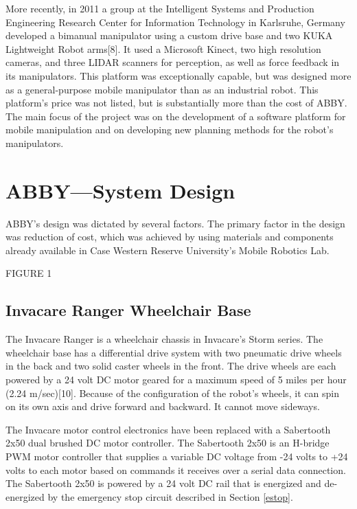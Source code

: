\documentclass[]{cwru} %
\begin{document}
More recently, in 2011 a group at the Intelligent Systems and Production
Engineering Research Center for Information Technology in Karlsruhe,
Germany developed a bimanual manipulator using a custom drive base and
two KUKA Lightweight Robot arms{[}8{]}. It used a Microsoft Kinect, two
high resolution cameras, and three LIDAR scanners for perception, as
well as force feedback in its manipulators. This platform was
exceptionally capable, but was designed more as a general-purpose mobile
manipulator than as an industrial robot. This platform's price was not
listed, but is substantially more than the cost of ABBY. The main focus
of the project was on the development of a software platform for mobile
manipulation and on developing new planning methods for the robot's
manipulators.


\chapter{ABBY---System Design}

ABBY's design was dictated by several factors. The primary factor in the
design was reduction of cost, which was achieved by using materials and
components already available in Case Western Reserve University's Mobile
Robotics Lab.

FIGURE 1

\section{Invacare Ranger Wheelchair Base}

The Invacare Ranger is a wheelchair chassis in Invacare's Storm series.
The wheelchair base has a differential drive system with two pneumatic
drive wheels in the back and two solid caster wheels in the front. The
drive wheels are each powered by a 24 volt DC motor geared for a maximum
speed of 5 miles per hour (2.24 m/sec){[}10{]}. Because of the
configuration of the robot's wheels, it can spin on its own axis and
drive forward and backward. It cannot move sideways.

The Invacare motor control electronics have been replaced with a
Sabertooth 2x50 dual brushed DC motor controller. The Sabertooth 2x50 is
an H-bridge PWM motor controller that supplies a variable DC voltage
from -24 volts to +24 volts to each motor based on commands it receives
over a serial data connection. The Sabertooth 2x50 is powered by a 24
volt DC rail that is energized and de-energized by the emergency stop
circuit described in Section \ref{estop}.
\end{document}
